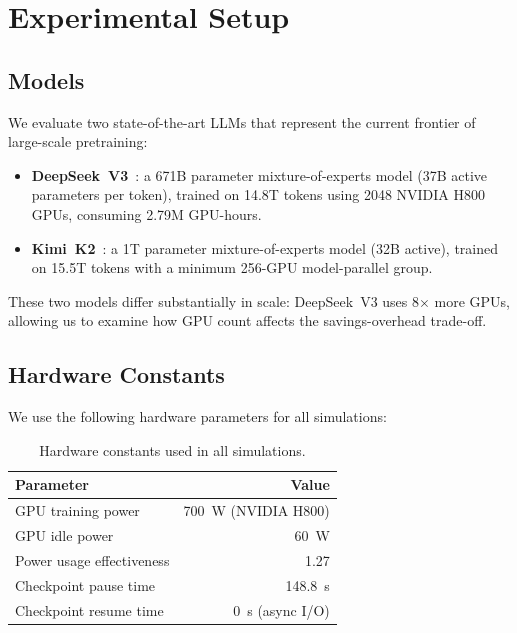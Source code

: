 
\chapter{Experimental Setup}
\label{sec:experimental_setup}

\section{Models}
\label{sec:models}

We evaluate two state-of-the-art LLMs that represent the current frontier of
large-scale pretraining:

\begin{itemize}
  \item \textbf{DeepSeek~V3}~\cite{deepseek-ai_deepseek-v3_2024}: a 671B
    parameter mixture-of-experts model (37B active parameters per
    token), trained on 14.8T
    tokens using 2048 NVIDIA H800 GPUs, consuming 2.79M GPU-hours.
  \item \textbf{Kimi~K2}~\cite{kimi_team_kimi_2025}: a 1T parameter
    mixture-of-experts model
    (32B active), trained on 15.5T tokens with a minimum 256-GPU model-parallel
    group.
\end{itemize}

These two models differ substantially in scale: DeepSeek~V3 uses 8$\times$ more
GPUs, allowing us to examine how GPU count affects the savings-overhead
trade-off.

\section{Hardware Constants}
\label{sec:hardware-constants}

We use the following hardware parameters for all simulations:

\begin{table}
  \centering
  \caption{Hardware constants used in all simulations.}
  \label{tab:constants}
  \small
  \begin{tabular}{lr}
    \toprule
    Parameter & Value \\
    \midrule
    GPU training power & 700~W (NVIDIA H800) \\
    GPU idle power & 60~W \\
    Power usage effectiveness & 1.27 \\
    Checkpoint pause time & 148.8~s \\
    Checkpoint resume time & 0~s (async I/O) \\
    \bottomrule
  \end{tabular}
\end{table}

